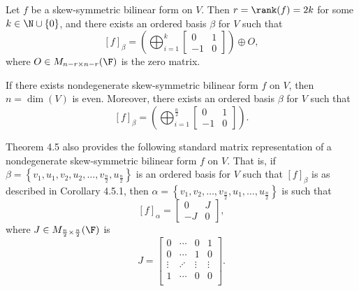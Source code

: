 \documentclass[linearalgebraII]{subfiles}
\begin{document}
    \begin{theorem}{}
        Let $f$ be a skew-symmetric bilinear form on $V$. Then $r=\rank(f)=2k$ for some $k\in\N\cup\left\lbrace 0 \right\rbrace$, and there exists an ordered basis $\beta$ for $V$ such that
        \begin{equation*}
            \left[ f \right] _\beta = \left( \bigoplus^{k}_{i=1} \begin{bmatrix} 0 & 1 \\ -1 & 0 \end{bmatrix} \right) \oplus O,
        \end{equation*}
        where $O\in M_{n-r\times n-r}(\F)$ is the zero matrix. 
    \end{theorem}

    \begin{cor}{}
        If there exists nondegenerate skew-symmetric bilinear form $f$ on $V$, then $n=\dim(V)$ is even. Moreover, there exists an ordered basis $\beta$ for $V$ such that
        \begin{equation*}
            \left[ f \right] _\beta = \left( \bigoplus^{\frac{n}{2}}_{i=1} \begin{bmatrix} 0 & 1 \\ -1 & 0 \end{bmatrix} \right).
        \end{equation*}
    \end{cor}	

    \begin{remark}
        Theorem 4.5 also provides the following standard matrix representation of a nondegenerate skew-symmetric bilinear form $f$ on $V$. That is, if $\beta = \left\lbrace v_1,u_1, v_2,u_2,\ldots,v_{\frac{n}{2}}, u_{\frac{n}{2}} \right\rbrace $ is an ordered basis for $V$ such that $\left[ f \right] _\beta$ is as described in Corollary 4.5.1, then $\alpha = \left\lbrace v_1,v_2,\ldots, v_{\frac{n}{2}}, u_1, \ldots, u_{\frac{n}{2}} \right\rbrace$ is such that
        \begin{equation*}
            \left[ f \right] _\alpha = \begin{bmatrix} 0 & J \\ -J & 0 \end{bmatrix},
        \end{equation*}
        where $J\in M_{\frac{n}{2}\times \frac{n}{2}}(\F)$ is
        \begin{equation*}
            J = 
            \begin{bmatrix}
                0 & \cdots & 0 & 1 \\
                0 & \cdots & 1 & 0 \\
                \vdots & \iddots & \vdots & \vdots \\
                1 & \cdots & 0 & 0 \\
            \end{bmatrix}.
        \end{equation*}
    \end{remark}
\end{document}
